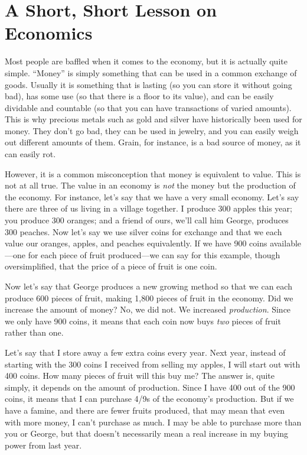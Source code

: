 \section{A Short, Short Lesson on Economics}

Most people are baffled when it comes to the economy, but it is actually
quite simple. “Money” is simply something that can be used in a common
exchange of goods. Usually it is something that is lasting (so you can
store it without going bad), has some use (so that there is a floor to
its value), and can be easily dividable and countable (so that you can
have transactions of varied amounts). This is why precious metals such
as gold and silver have historically been used for money. They don’t go
bad, they can be used in jewelry, and you can easily weigh out
different amounts of them. Grain, for instance, is a bad source of
money, as it can easily rot. 

However, it is a common misconception that money is equivalent to value.
This is not at all true. The value in an economy is \textit{not} the
money but the production of the economy. For instance, let’s say that
we have a very small economy. Let’s say there are three of us living in
a village together. I produce 300 apples this year; you produce 300
oranges; and a friend of ours, we’ll call him George, produces 300
peaches. Now let’s say we use silver coins for exchange and that we
each value our oranges, apples, and peaches equivalently.
If we have 900 coins
available—one for each piece of fruit produced—we can say for this
example, though
oversimplified, that the price of a piece of fruit is one coin. 

Now let’s say that George produces a new growing method so that we can
each produce 600 pieces of fruit,
making 1,800 pieces
of fruit in the economy. Did we increase the amount of money?  No, we
did not. We increased \textit{production}. Since we only have 900
coins, it means that each coin now buys \textit{two} pieces of fruit
rather than one.

Let’s say that I store away a few extra coins every year. Next year,
instead of starting with the 300 coins I received from selling my
apples, I will start out with 400 coins. How many pieces of fruit will
this buy me? The answer is, quite simply, it depends on the amount of
production. Since I have 400 out of the 900 coins, it means that I can
purchase 4/9s of the economy’s production. But if we have a famine, and
there are fewer fruits produced, that may mean that even with more
money, I can’t purchase as much. I may be able to purchase more than
you or George, but that doesn’t necessarily mean a real increase in my
buying power from last year.

